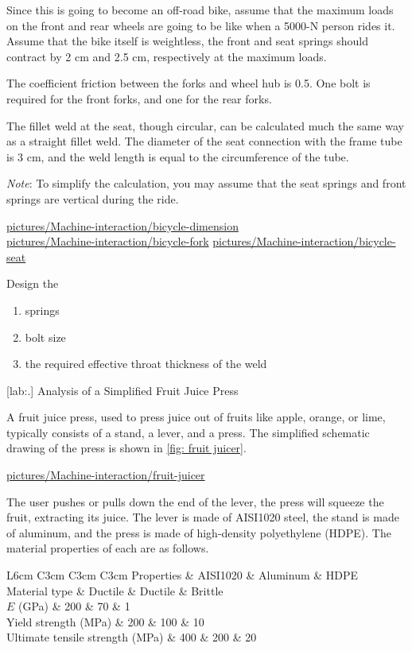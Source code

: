 \documentclass[a4paper,openany,12pt]{book}
\begin{document}
{{Since this is going to become an off-road bike, assume that the maximum
loads on the front and rear wheels are going to be like when a 5000-N
person rides it. Assume that the bike itself is weightless, the front
and seat springs should contract by 2 cm and 2.5 cm, respectively at the
maximum loads.

The coefficient friction between the forks and wheel hub is 0.5. One
bolt is required for the front forks, and one for the rear forks.

The fillet weld at the seat, though circular, can be calculated much the
same way as a straight fillet weld. The diameter of the seat connection
with the frame tube is 3 cm, and the weld length is equal to the
circumference of the tube.

\emph{Note}: To simplify the calculation, you may assume that the seat
springs and front springs are vertical during the ride.

\url{pictures/Machine-interaction/bicycle-dimension}\\
\url{pictures/Machine-interaction/bicycle-fork}
\url{pictures/Machine-interaction/bicycle-seat}

Design the

\begin{enumerate}
\item springs

\item bolt size

\item the required effective throat thickness of the weld
\end{enumerate}

[lab:.]
Analysis of a Simplified Fruit Juice Press

A fruit juice press, used to press juice out of fruits like apple,
orange, or lime, typically consists of a stand, a lever, and a press.
The simplified schematic drawing of the press is shown in
\ref{fig: fruit juicer}.


\url{pictures/Machine-interaction/fruit-juicer}

The user pushes or pulls down the end of the lever, the press will
squeeze the fruit, extracting its juice. The lever is made of AISI1020
steel, the stand is made of aluminum, and the press is made of
high-density polyethylene (HDPE). The material properties of each are as
follows.


 L6cm C3cm C3cm C3cm Properties \& AISI1020 \& Aluminum \& HDPE\\
Material type \& Ductile \& Ductile \& Brittle\\
\(E\) (GPa) \& 200 \& 70 \& 1\\
Yield strength (MPa) \& 200 \& 100 \& 10\\
Ultimate tensile strength (MPa) \& 400 \& 200 \& 20\\

}}
\end{document}
